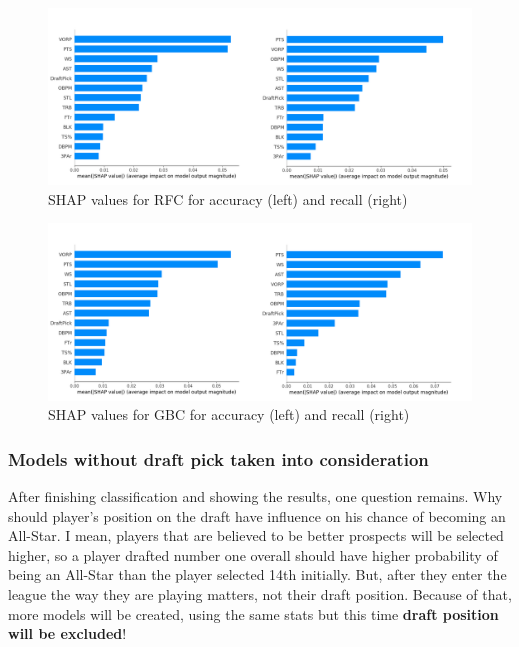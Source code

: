 \documentclass[a4paper]{article}
\begin{document}
\begin{figure}[h!]
\begin{center}
\includegraphics[scale=0.3]{rfc_shap.png}
\end{center}
\caption{SHAP values for RFC for accuracy (left) and recall (right)}
\label{plt:shap_rfc_all_star}
\end{figure}

\begin{figure}[h!]
\begin{center}
\includegraphics[scale=0.3]{gbc_shap.png}
\end{center}
\caption{SHAP values for GBC for accuracy (left) and recall (right)}
\label{plt:shap_gbc_all_star}
\end{figure}

\subsubsection{Models without draft pick taken into consideration}
\label{subsubsec:without_draft_pick_all_star}

After finishing classification and showing the results, one question remains. Why should player's position on the draft have influence on his chance of becoming an All-Star. I mean, players that are believed to be better prospects will be selected higher, so a player drafted number one overall should have higher probability of being an All-Star than the player selected 14th initially. But, after they enter the league the way they are playing matters, not their draft position. Because of that, more models will be created, using the same stats but this time \textbf{draft position will be excluded}!
\end{document}
